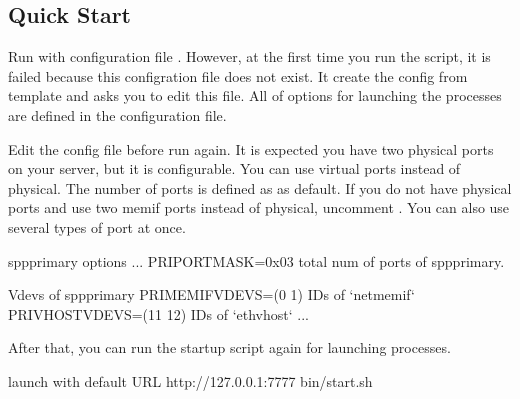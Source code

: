 \documentclass[a4paper,11pt,openany,oneside,english]{sphinxmanual}
\begin{document}
\subsection{Quick Start}
\label{\detokenize{gsg/howto_use:quick-start}}\label{\detokenize{gsg/howto_use:spp-gsg-howto-quick-start}}
Run  with configuration file . However,
at the first time you run the script, it is failed because this configration
file does not exist. It create the config from template
 and asks you to edit this file.
All of options for launching the processes are defined in the configuration
file.

Edit the config file before run  again. It is expected you
have two physical ports on your server, but it is configurable.
You can use virtual ports instead of physical.
The number of ports is defined as  as default.
If you do not have physical ports and use two memif ports instead of physical,
uncomment .
You can also use several types of port at once.

\begin{sphinxVerbatim}[commandchars=\\\{\},formatcom=\footnotesize]
\PYGZsh{} spp\PYGZus{}primary options
...
PRI\PYGZus{}PORTMASK=0x03  \PYGZsh{} total num of ports of spp\PYGZus{}primary.

\PYGZsh{} Vdevs of spp\PYGZus{}primary
\PYGZsh{}PRI\PYGZus{}MEMIF\PYGZus{}VDEVS=(0 1)  \PYGZsh{} IDs of {}`net\PYGZus{}memif{}`
\PYGZsh{}PRI\PYGZus{}VHOST\PYGZus{}VDEVS=(11 12)  \PYGZsh{} IDs of {}`eth\PYGZus{}vhost{}`
...
\end{sphinxVerbatim}

After that, you can run the startup script again for launching processes.

\begin{sphinxVerbatim}[commandchars=\\\{\},formatcom=\footnotesize]
 launch with default URL http://127.0.0.1:7777
 bin/start.sh

\end{sphinxVerbatim}
\end{document}
